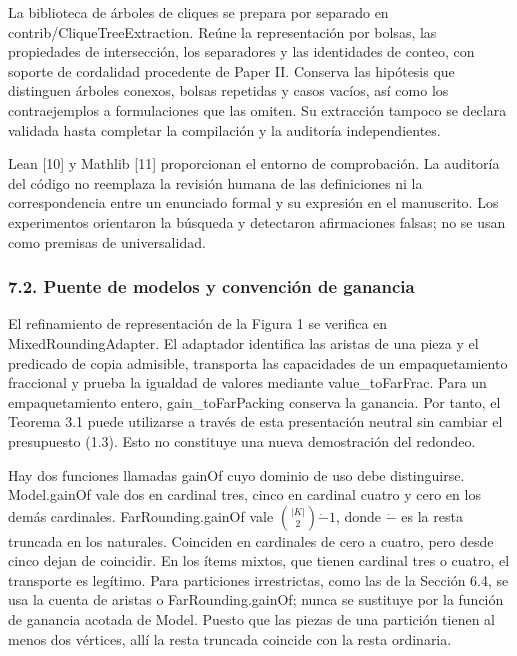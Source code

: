 \documentclass[spanish,11pt,a4paper]{article}
\begin{document}
La biblioteca de árboles de cliques se prepara por separado en {\ttfamily\small contrib/\discretionary{\hbox{\ensuremath{\hookrightarrow}}}{}{}CliqueTreeEx\discretionary{\hbox{\ensuremath{\hookrightarrow}}}{}{}traction}. Reúne la representación por bolsas, las propiedades de intersección, los separadores y las identidades de conteo, con soporte de cordalidad procedente de Paper II. Conserva las hipótesis que distinguen árboles conexos, bolsas repetidas y casos vacíos, así como los contraejemplos a formulaciones que las omiten. Su extracción tampoco se declara validada hasta completar la compilación y la auditoría independientes.

Lean {[}10{]} y Mathlib {[}11{]} proporcionan el entorno de comprobación. La auditoría del código no reemplaza la revisión humana de las definiciones ni la correspondencia entre un enunciado formal y su expresión en el manuscrito. Los experimentos orientaron la búsqueda y detectaron afirmaciones falsas; no se usan como premisas de universalidad.

\subsubsection{7.2. Puente de modelos y convención de ganancia}\label{puente-de-modelos-y-convencion-de-ganancia}

El refinamiento de representación de la Figura 1 se verifica en {\ttfamily\small MixedRoundin\discretionary{\hbox{\ensuremath{\hookrightarrow}}}{}{}gAdapter}. El adaptador identifica las aristas de una pieza y el predicado de copia admisible, transporta las capacidades de un empaquetamiento fraccional y prueba la igualdad de valores mediante {\ttfamily\small value\_\discretionary{\hbox{\ensuremath{\hookrightarrow}}}{}{}toFarFrac}. Para un empaquetamiento entero, {\ttfamily\small gain\_\discretionary{\hbox{\ensuremath{\hookrightarrow}}}{}{}toFarPacking} conserva la ganancia. Por tanto, el Teorema 3.1 puede utilizarse a través de esta presentación neutral sin cambiar el presupuesto (1.3). Esto no constituye una nueva demostración del redondeo.

Hay dos funciones llamadas {\ttfamily\small gainOf} cuyo dominio de uso debe distinguirse. {\ttfamily\small Model.\discretionary{\hbox{\ensuremath{\hookrightarrow}}}{}{}gainOf} vale dos en cardinal tres, cinco en cardinal cuatro y cero en los demás cardinales. {\ttfamily\small FarRounding.\discretionary{\hbox{\ensuremath{\hookrightarrow}}}{}{}gainOf} vale \(\binom{|K|}{2}\mathbin{\dot-}1\), donde \(\dot-\) es la resta truncada en los naturales. Coinciden en cardinales de cero a cuatro, pero desde cinco dejan de coincidir. En los ítems mixtos, que tienen cardinal tres o cuatro, el transporte es legítimo. Para particiones irrestrictas, como las de la Sección 6.4, se usa la cuenta de aristas o {\ttfamily\small FarRounding.\discretionary{\hbox{\ensuremath{\hookrightarrow}}}{}{}gainOf}; nunca se sustituye por la función de ganancia acotada de {\ttfamily\small Model}. Puesto que las piezas de una partición tienen al menos dos vértices, allí la resta truncada coincide con la resta ordinaria.
\end{document}

